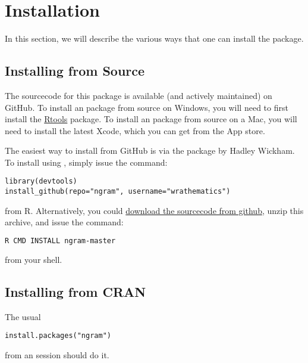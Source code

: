 \section{Installation}
\label{sec:installation}

In this section, we will describe the various ways that one can install the 
\thispackage package.


\subsection{Installing from Source}

The sourcecode for this package is available (and actively maintained) on 
GitHub.  To install an \R package from source on Windows, you will 
need to first install the 
\href{http://cran.r-project.org/bin/windows/Rtools/Rtools216.exe}{Rtools} 
package.  To install an \R package from source on a Mac, you will need to install
the latest Xcode, which you can get from the App store.

The easiest way to install \thispackage from GitHub is via the 
\href{http://cran.r-project.org/web/packages/devtools/index.html}%
{}
package by Hadley Wickham.  To install \thispackage
using , simply issue the command:
\begin{lstlisting}[language=rr]
library(devtools)
install_github(repo="ngram", username="wrathematics")
\end{lstlisting}
from R.  Alternatively, you could  
\href{https://github.com/wrathematics/ngram/archive/master.zip}%
{download the sourcecode from github}, 
unzip this archive, and issue the command:
\begin{lstlisting}[language=sh]
R CMD INSTALL ngram-master
\end{lstlisting}
from your shell.


\subsection{Installing from CRAN}

The usual
\begin{lstlisting}[language=rr]
install.packages("ngram")
\end{lstlisting}
from an  session should do it.